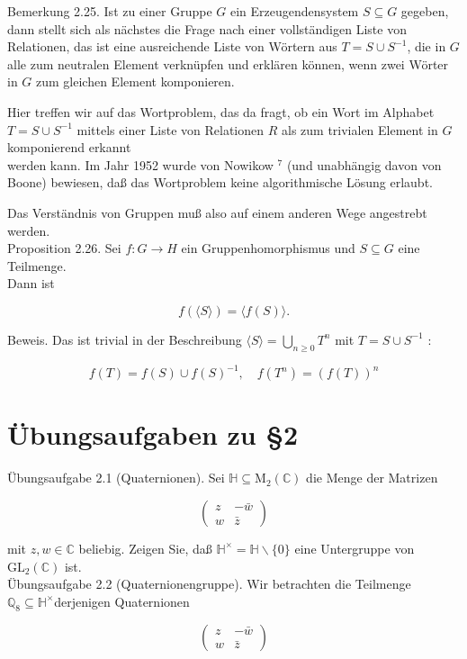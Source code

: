 \documentclass[10pt, letterpaper]{article}
\begin{document}
Bemerkung 2.25. Ist zu einer Gruppe $G$ ein Erzeugendensystem $S \subseteq G$ gegeben, dann stellt sich als nächstes die Frage nach einer vollständigen Liste von Relationen, das ist eine ausreichende Liste von Wörtern aus $T=S \cup S^{-1}$, die in $G$ alle zum neutralen Element verknüpfen und erklären können, wenn zwei Wörter in $G$ zum gleichen Element komponieren.

Hier treffen wir auf das Wortproblem, das da fragt, ob ein Wort im Alphabet $T=S \cup S^{-1}$ mittels einer Liste von Relationen $R$ als zum trivialen Element in $G$ komponierend erkannt\\
werden kann. Im Jahr 1952 wurde von Nowikow ${ }^{7}$ (und unabhängig davon von Boone) bewiesen, daß das Wortproblem keine algorithmische Lösung erlaubt.

Das Verständnis von Gruppen muß also auf einem anderen Wege angestrebt werden.\\
Proposition 2.26. Sei $f: G \rightarrow H$ ein Gruppenhomorphismus und $S \subseteq G$ eine Teilmenge.\\
Dann ist

$$
f(\langle S\rangle)=\langle f(S)\rangle .
$$

Beweis. Das ist trivial in der Beschreibung $\langle S\rangle=\bigcup_{n \geq 0} T^{n}$ mit $T=S \cup S^{-1}$ :

$$
f(T)=f(S) \cup f(S)^{-1}, \quad f\left(T^{n}\right)=(f(T))^{n}
$$

\section*{Übungsaufgaben zu §2}
Übungsaufgabe 2.1 (Quaternionen). Sei $\mathbb{H} \subseteq \mathrm{M}_{2}(\mathbb{C})$ die Menge der Matrizen

$$
\left(\begin{array}{cc}
z & -\bar{w} \\
w & \bar{z}
\end{array}\right)
$$

mit $z, w \in \mathbb{C}$ beliebig. Zeigen Sie, daß $\mathbb{H}^{\times}=\mathbb{H} \backslash\{0\}$ eine Untergruppe von $\mathrm{GL}_{2}(\mathbb{C})$ ist.\\
Übungsaufgabe 2.2 (Quaternionengruppe). Wir betrachten die Teilmenge $\mathbb{Q}_{8} \subseteq \mathbb{H}^{\times}$derjenigen Quaternionen

$$
\left(\begin{array}{cc}
z & -\bar{w} \\
w & \bar{z}
\end{array}\right)
$$
\end{document}
